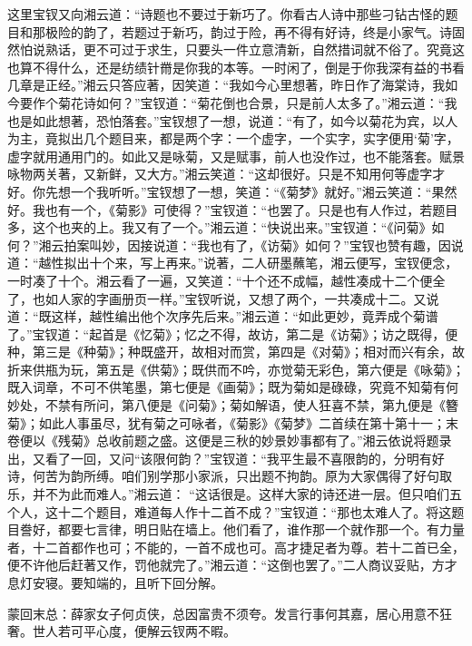 \begin{parag}
    这里宝钗又向湘云道：“诗题也不要过于新巧了。你看古人诗中那些刁钻古怪的题目和那极险的韵了，若题过于新巧，韵过于险，再不得有好诗，终是小家气。诗固然怕说熟话，更不可过于求生，只要头一件立意清新，自然措词就不俗了。究竟这也算不得什么，还是纺绩针黹是你我的本等。一时闲了，倒是于你我深有益的书看几章是正经。”湘云只答应著，因笑道：“我如今心里想著，昨日作了海棠诗，我如今要作个菊花诗如何？”宝钗道：“菊花倒也合景，只是前人太多了。”湘云道：“我也是如此想著，恐怕落套。”宝钗想了一想，说道：“有了，如今以菊花为宾，以人为主，竟拟出几个题目来，都是两个字：一个虚字，一个实字，实字便用‘菊’字，虚字就用通用门的。如此又是咏菊，又是赋事，前人也没作过，也不能落套。赋景咏物两关著，又新鲜，又大方。”湘云笑道：“这却很好。只是不知用何等虚字才好。你先想一个我听听。”宝钗想了一想，笑道：“《菊梦》就好。”湘云笑道：“果然好。我也有一个，《菊影》可使得？”宝钗道：“也罢了。只是也有人作过，若题目多，这个也夹的上。我又有了一个。”湘云道：“快说出来。”宝钗道：“《问菊》如何？”湘云拍案叫妙，因接说道：“我也有了，《访菊》如何？”宝钗也赞有趣，因说道：“越性拟出十个来，写上再来。”说著，二人研墨蘸笔，湘云便写，宝钗便念，一时凑了十个。湘云看了一遍，又笑道：“十个还不成幅，越性凑成十二个便全了，也如人家的字画册页一样。”宝钗听说，又想了两个，一共凑成十二。又说道：“既这样，越性编出他个次序先后来。”湘云道：“如此更妙，竟弄成个菊谱了。”宝钗道：“起首是《忆菊》；忆之不得，故访，第二是《访菊》；访之既得，便种，第三是《种菊》；种既盛开，故相对而赏，第四是《对菊》；相对而兴有余，故折来供瓶为玩，第五是《供菊》；既供而不吟，亦觉菊无彩色，第六便是《咏菊》；既入词章，不可不供笔墨，第七便是《画菊》；既为菊如是碌碌，究竟不知菊有何妙处，不禁有所问，第八便是《问菊》；菊如解语，使人狂喜不禁，第九便是《簪菊》；如此人事虽尽，犹有菊之可咏者，《菊影》《菊梦》二首续在第十第十一；末卷便以《残菊》总收前题之盛。这便是三秋的妙景妙事都有了。”湘云依说将题录出，又看了一回，又问“该限何韵？”宝钗道：“我平生最不喜限韵的，分明有好诗，何苦为韵所缚。咱们别学那小家派，只出题不拘韵。原为大家偶得了好句取乐，并不为此而难人。”湘云道： “这话很是。这样大家的诗还进一层。但只咱们五个人，这十二个题目，难道每人作十二首不成？”宝钗道：“那也太难人了。将这题目誊好，都要七言律，明日贴在墙上。他们看了，谁作那一个就作那一个。有力量者，十二首都作也可；不能的，一首不成也可。高才捷足者为尊。若十二首已全，便不许他后赶著又作，罚他就完了。”湘云道：“这倒也罢了。”二人商议妥贴，方才息灯安寝。要知端的，且听下回分解。
\end{parag}


\begin{parag}
    \begin{note}蒙回末总：薛家女子何贞侠，总因富贵不须夸。发言行事何其嘉，居心用意不狂奢。世人若可平心度，便解云钗两不暇。\end{note}
\end{parag}

